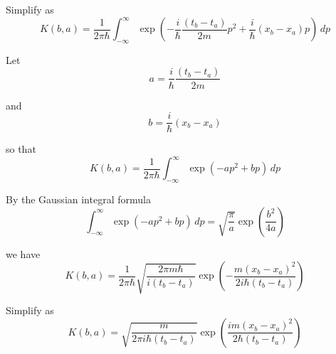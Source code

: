 Simplify as
\begin{equation*}
K(b,a)=\frac{1}{2\pi\hbar}\int_{-\infty}^\infty
\exp\left(-\frac{i}{\hbar}\frac{(t_b-t_a)}{2m}p^2+\frac{i}{\hbar}(x_b-x_a)p\right)\,dp
\end{equation*}

Let
\begin{equation*}
a=\frac{i}{\hbar}\frac{(t_b-t_a)}{2m}
\end{equation*}

and
\begin{equation*}
b=\frac{i}{\hbar}(x_b-x_a)
\end{equation*}

so that
\begin{equation*}
K(b,a)=\frac{1}{2\pi\hbar}
\int_{-\infty}^\infty
\exp\left(-ap^2+bp\right)\,dp
\end{equation*}

By the Gaussian integral formula
\begin{equation*}
\int_{-\infty}^\infty\exp\left(-ap^2+bp\right)\,dp
=\sqrt{\frac{\pi}{a}}\exp\left(\frac{b^2}{4a}\right)
\end{equation*}

we have
\begin{equation*}
K(b,a)=\frac{1}{2\pi\hbar}
\sqrt{\frac{2\pi m\hbar}{i(t_b-t_a)}}
\exp\left(-\frac{m(x_b-x_a)^2}{2i\hbar(t_b-t_a)}\right)
\end{equation*}

Simplify as
\begin{equation*}
K(b,a)=
\sqrt{\frac{m}{2\pi i\hbar(t_b-t_a)}}
\exp\left(\frac{im(x_b-x_a)^2}{2\hbar(t_b-t_a)}\right)
\tag{1}
\end{equation*}


